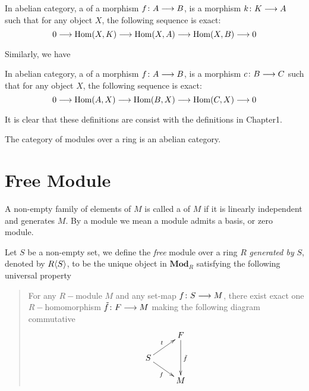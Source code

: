   \begin{defn}
    In abelian category, a  of a morphism $f\colon A\longrightarrow B$, is a morphism $k\colon K\longrightarrow A$ such that for any object $X$, the following sequence is exact:
    \begin{equation*}
      0 \longrightarrow \operatorname{Hom}(X,K) \longrightarrow \operatorname{Hom}(X,A) \longrightarrow \operatorname{Hom}(X,B) \longrightarrow 0
    \end{equation*}
  \end{defn}

  Similarly, we have
  \begin{defn}
    In abelian category, a  of a morphism $f\colon A\longrightarrow B$, is a morphism $c\colon B\longrightarrow C$ such that for any object $X$, the following sequence is exact:
    \begin{equation*}
      0 \longrightarrow \operatorname{Hom}(A,X) \longrightarrow \operatorname{Hom}(B,X) \longrightarrow \operatorname{Hom}(C,X) \longrightarrow 0
    \end{equation*}
  \end{defn}
  \begin{rem}
    It is clear that these definitions are consist with the definitions in Chapter1.
  \end{rem}

  \begin{thm}
    The category of modules over a ring is an abelian category.
  \end{thm}

\newpage\section{Free Module}
  \begin{defn}
    A non-empty family of elements of $M$ is called a  of $M$ if it is linearly independent and generates $M$. By a  module we mean a module admits a basis, or zero module.
  \end{defn}

  \begin{defn}
    Let $S$ be a non-empty set, we define the \emph{free} module over a ring $R$ \emph{generated by} $S$, denoted by $R\langle S\rangle$, to be the unique object in $\mathbf{Mod}_R$ satisfying the following universal property
    \begin{quote}
      For any $R-$module $M$ and any set-map $f\colon S\longrightarrow M$, there exist exact one $R-$homomorphism $\tilde{f}\colon F\longrightarrow M$ making the following diagram commutative
      \begin{displaymath}
        \xymatrix@R=0.5cm{
                &         F \ar[dd]^{\tilde{f}}     \\
              S \ar[ur]^{t} \ar[dr]_{f}                 \\
                &         M                 }
      \end{displaymath}
    \end{quote}
  \end{defn}

